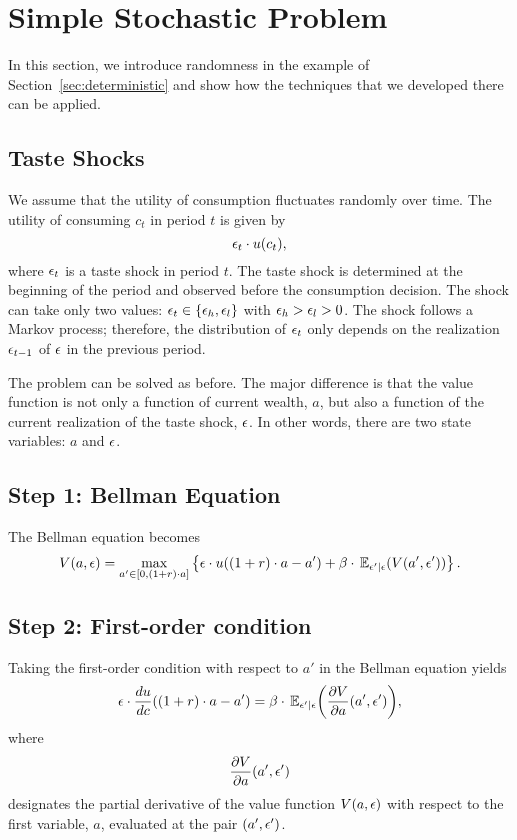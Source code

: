 \documentclass[letterpaper,12pt,leqno]{article}
\begin{document}
\section{Simple Stochastic Problem}\label{sec:stochastic}

In this section, we introduce randomness in the example of Section~\ref{sec:deterministic} and show how the techniques that we developed there can be applied.

\subsection{Taste Shocks}

We assume that the utility of consumption fluctuates randomly over time. The utility of consuming $c_{t}$ in period $t$ is given by
\begin{equation*}
\epsilon_t \cdot u(c_t),
\end{equation*}
where $\epsilon_t$ is a taste shock in period $t$. The taste shock is determined at the beginning of the period and observed before the consumption decision. The shock can take only two values: $\epsilon_{t}\in\{\epsilon_h,\epsilon_l\}$ with $\epsilon_h>\epsilon_l>0$. The shock follows a Markov process; therefore, the distribution of $\epsilon_t$ only depends on the realization $\epsilon_{t-1}$ of $\epsilon$ in the previous period. 

The problem can be solved as before. The major difference is that the value function is not only a function of current wealth, $a$, but also a function of the current realization of the taste shock, $\epsilon$. In other words, there are two state variables: $a$ and $\epsilon$.

\subsection{Step 1: Bellman Equation}

The Bellman equation becomes
\begin{equation*}
V(a,\e)=\max_{a'\in[0,(1+r)\cdot a]} \bc{\e \cdot u((1+r)\cdot a-a')+\b\cdot \E[\e'|\e]{ V(a',\e')}}.
\end{equation*}
\subsection{Step 2: First-order condition}
Taking the first-order condition with respect to $a'$ in the Bellman equation yields
\begin{equation}
\e \cdot \od{u}{c}((1+r)\cdot a-a')=\b\cdot\E[\e'|\e]{\pd{V}{a}(a',\e')},\label{eq:foc0}
\end{equation}
where 
\[\frac{\partial V}{\partial a}(a',\epsilon')\]
designates the partial derivative of the value function $V(a,\epsilon)$ with respect to the first variable, $a$, evaluated at the pair $(a',\epsilon')$.
\end{document}

